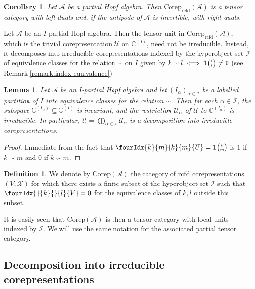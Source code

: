 \documentclass[10pt]{article}
\DeclareMathOperator{\rcf}{\mathrm{rcfd}}
\newcommand{\Corep}{\mathrm{Corep}}
\newcommand{\C}{\mathbb{C}}
\newcommand{\Grt}[3]{#1{\tiny{\begin{pmatrix} #2\\#3\end{pmatrix}}}}
\newcommand{\UnitC}[2]{\Grt{\mathbf{1}}{#1}{#2}}
\newcommand{\Gr}[5]{\fourIdx{#2}{#4}{#3}{#5}{#1}}%
\newcommand{\Gru}[3]{\Gr{#1}{}{}{#2}{#3}}
\newtheorem{Lem}[Theorem]{Lemma}
\newtheorem{Cor}[Theorem]{Corollary}
\theoremstyle{definition}
\newtheorem{Def}[Theorem]{Definition}
\numberwithin{equation}{section}
\begin{document}
\begin{Cor} \label{cor:rep-tensor-duality}
  Let $\mathscr{A}$ be a partial Hopf algebra. Then
  $\Corep_{\rcf}(\mathscr{A})$ is a tensor category with left
  duals and, if the antipode of $\mathscr{A}$ is invertible, with right duals.
\end{Cor}

Let $\mathscr{A}$ be an $I$-partial Hopf algebra.  Then the tensor
unit in $\Corep_{\rcf}(\mathscr{A})$, which is the trivial corepresentation
$\mathscr{U}$ on $\C^{(I)}$, need not be irreducible. Instead, it decomposes
into irreducible corepresentations indexed by the hyperobject set $\mathscr{I}$ of equivalence
classes for the relation $\sim$ on $I$ given by  $k \sim l \iff
  \UnitC{k}{l}\neq 0$ (see Remark
\ref{remark:index-equivalence}).
\begin{Lem}
  Let $\mathscr{A}$ be an $I$-partial Hopf algebra and let
  $(I_{\alpha})_{\alpha\in \mathscr{I}}$ be a labelled partition of $I$ into
  equivalence classes for the relation $\sim$.  Then for each $\alpha\in \mathscr{I}$, the subspace
  $\C^{(I_{\alpha})} \subseteq \C^{(I)}$ is invariant, and the restriction
  $\mathscr{U_{\alpha}}$ of $\mathscr{U}$ to $\C^{(I_{\alpha})}$ is
  irreducible. In particular, $\mathscr{U}=\bigoplus_{\alpha\in\mathscr{I}}
  \mathscr{U_{\alpha}}$ is a decomposition into irreducible corepresentations.
\end{Lem}
\begin{proof}
Immediate from the fact that $\Gr{U}{k}{k}{m}{m} = 
  \UnitC{k}{m}$  is $1$  if $k\sim m$  and $0$ if $k\not\sim m$. 
\end{proof}

\begin{Def} We denote by $\Corep(\mathscr{A})$ the category of rcfd corepresentations $(V,\mathscr{X})$ for which there exists a finite subset of the hyperobject set $\mathscr{I}$ such that $\Gru{V}{k}{l}=0$ for the equivalence classes of $k,l$ outside this subset.
\end{Def}

It is easily seen that $\Corep(\mathscr{A})$ is then a tensor category with local units indexed by $\mathscr{I}$. We will use the same notation for the associated partial tensor category. 


\subsection{Decomposition into irreducible corepresentations}
\end{document}

